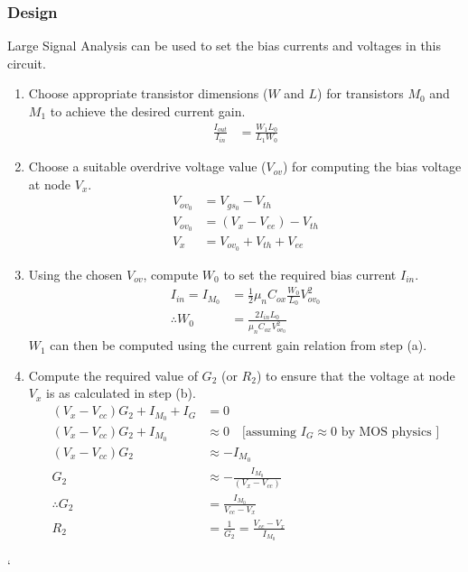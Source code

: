 \subsubsection{Design}
Large Signal Analysis can be used to set the bias
currents and voltages in this circuit.
\begin{enumerate}
  \item Choose appropriate transistor dimensions
    ($W$ and $L$) for transistors $M_0$ and $M_1$
    to achieve the desired current gain.
    \begin{align*}
      \frac{I_{out}}{I_{in}} &= \frac{W_1 L_0}{L_1 W_0}
    \end{align*}
  \item Choose a suitable overdrive voltage value
    ($V_{ov}$) for computing the bias voltage at
    node $V_{x}$.
    \begin{align*}
      V_{ov_0} &= V_{gs_0} - V_{th} \\
      V_{ov_0} &= (V_{x} - V_{ee}) - V_{th} \\
      V_{x} &= V_{ov_0} + V_{th} + V_{ee}
    \end{align*}
  \item Using the chosen $V_{ov}$, compute $W_0$
    to set the required bias current $I_{in}$.
    \begin{align*}
      I_{in} = I_{M_0} &= \frac{1}{2} \mu_n C_{ox} \frac{W_0}{L_0} V_{ov_0}^2 \\
      \therefore W_0 &= \frac{2 I_{in} L_0}{\mu_n C_{ox} V_{ov_0}^2}
    \end{align*}
    $W_1$ can then be computed using the current
    gain relation from step (a).
  \item Compute the required value of $G_2$ (or
    $R_2$) to ensure that the voltage at node
    $V_{x}$ is as calculated in step (b).
    \begin{align*}
      (V_{x} - V_{cc})G_2 + I_{M_0} + I_{G} &= 0 \\
      (V_{x} - V_{cc})G_2 + I_{M_0} &\approx 0 \quad \text{[assuming } I_G \approx 0 \text{ by MOS physics ]} \\
      (V_{x} - V_{cc})G_2 &\approx - I_{M_0} \\
      G_2 &\approx - \frac{I_{M_0}}{(V_{x} - V_{cc})} \\
      \therefore G_2 &= \frac{I_{M_0}}{V_{cc} - V_{x}} \\
      R_2 &= \frac{1}{G_2} = \frac{V_{cc} - V_{x}}{I_{M_0}}
    \end{align*}
\end{enumerate}`

